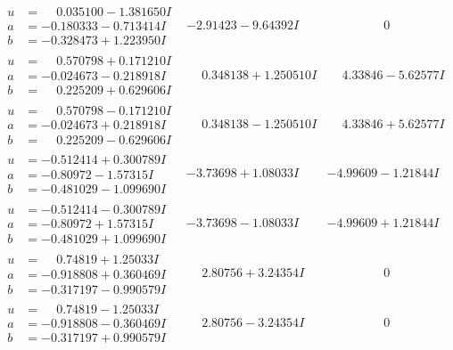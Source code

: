 \documentclass[1p]{elsarticle_modified}
\theoremstyle{definition}
\begin{document}
$$\begin{array}{c|c|c}
\begin{aligned}
u &= \phantom{-}0.035100 - 1.381650 I \\
a &= -0.180333 - 0.713414 I \\
b &= -0.328473 + 1.223950 I\end{aligned}
 & -2.91423 - 9.64392 I & \phantom{-0.000000 } 0 \\ \hline\begin{aligned}
u &= \phantom{-}0.570798 + 0.171210 I \\
a &= -0.024673 - 0.218918 I \\
b &= \phantom{-}0.225209 + 0.629606 I\end{aligned}
 & \phantom{-}0.348138 + 1.250510 I & \phantom{-}4.33846 - 5.62577 I \\ \hline\begin{aligned}
u &= \phantom{-}0.570798 - 0.171210 I \\
a &= -0.024673 + 0.218918 I \\
b &= \phantom{-}0.225209 - 0.629606 I\end{aligned}
 & \phantom{-}0.348138 - 1.250510 I & \phantom{-}4.33846 + 5.62577 I \\ \hline\begin{aligned}
u &= -0.512414 + 0.300789 I \\
a &= -0.80972 - 1.57315 I \\
b &= -0.481029 - 1.099690 I\end{aligned}
 & -3.73698 + 1.08033 I & -4.99609 - 1.21844 I \\ \hline\begin{aligned}
u &= -0.512414 - 0.300789 I \\
a &= -0.80972 + 1.57315 I \\
b &= -0.481029 + 1.099690 I\end{aligned}
 & -3.73698 - 1.08033 I & -4.99609 + 1.21844 I \\ \hline\begin{aligned}
u &= \phantom{-}0.74819 + 1.25033 I \\
a &= -0.918808 + 0.360469 I \\
b &= -0.317197 - 0.990579 I\end{aligned}
 & \phantom{-}2.80756 + 3.24354 I & \phantom{-0.000000 } 0 \\ \hline\begin{aligned}
u &= \phantom{-}0.74819 - 1.25033 I \\
a &= -0.918808 - 0.360469 I \\
b &= -0.317197 + 0.990579 I\end{aligned}
 & \phantom{-}2.80756 - 3.24354 I & \phantom{-0.000000 } 0\\

\end{array}$$
\end{document}
